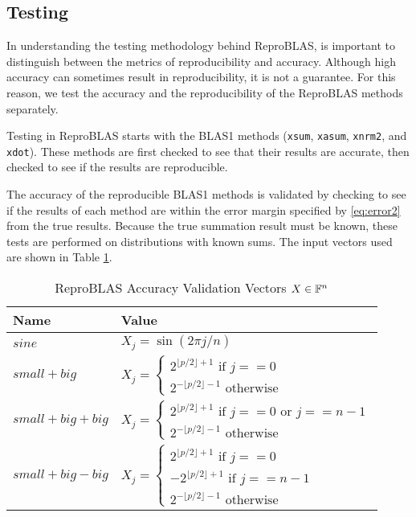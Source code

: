\subsection{Testing}
  In understanding the testing methodology behind ReproBLAS, is important to distinguish between the metrics of reproducibility and accuracy. Although high accuracy can sometimes result in reproducibility, it is not a guarantee. For this reason, we test the accuracy and the reproducibility of the ReproBLAS methods separately.

  Testing in ReproBLAS starts with the BLAS1 methods (\texttt{xsum}, \texttt{xasum}, \texttt{xnrm2}, and \texttt{xdot}). These methods are first checked to see that their results are accurate, then checked to see if the results are reproducible.

  The accuracy of the reproducible BLAS1 methods is validated by checking to see if the results of each method are within the error margin specified by \eqref{eq:error2} from the true results. Because the true summation result must be known, these tests are performed on distributions with known sums. The input vectors used are shown in Table \ref{tbl:validateblas1data}.

    \begin{table}[!htbp]
        \centering
        \begin{tabular}{ | l |  l |} \hline
            Name & Value\\ \hline
            $sine$ & $X_j = \sin(2 \pi j/n)$ \\ \hline
            $small + big$ & $X_j = \begin{cases} 2^{\lfloor p/2\rfloor + 1} \text{ if } j == 0 \\ 2^{-\lfloor p/2\rfloor - 1} \text{ otherwise} \end{cases}$ \\ \hline
            $small + big + big$ & $X_j = \begin{cases} 2^{\lfloor p/2\rfloor + 1} \text{ if } j == 0 \text{ or } j == n - 1 \\ 2^{-\lfloor p/2\rfloor - 1} \text{ otherwise} \end{cases}$\\ \hline
            $small + big - big$ & $X_j = \begin{cases} 2^{\lfloor p/2\rfloor + 1} \text{ if } j == 0\\-2^{\lfloor p/2\rfloor + 1} \text{ if } j == n - 1\\ 2^{-\lfloor p/2\rfloor - 1} \text{ otherwise} \end{cases}$\\ \hline
        \end{tabular}
        \caption{ReproBLAS Accuracy Validation Vectors $X \in \mathbb{F}^n$}
        \label{tbl:validateblas1data}
    \end{table}

